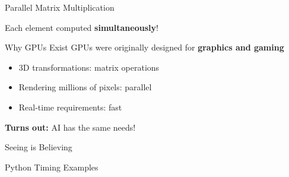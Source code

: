 \documentclass[10pt]{beamer}
\begin{document}
\begin{frame}{Parallel Matrix Multiplication}
  \begin{center}
  \end{center}
  
  \vspace{1em}
  \centering
  Each element computed \textbf{simultaneously}!
\end{frame}

\begin{frame}{Why GPUs Exist}
  GPUs were originally designed for \textbf{graphics and gaming}
  
  \vspace{1em}
  \begin{itemize}
    \item 3D transformations: matrix operations
    \item Rendering millions of pixels: parallel
    \item Real-time requirements: fast
  \end{itemize}
  
  \vspace{1em}
  \centering
  \textbf{Turns out:} AI has the same needs!
\end{frame}

\begin{frame}[standout]
  \Huge Seeing is Believing
  
  \vspace{1em}
  \Large Python Timing Examples
\end{frame}
\end{document}
